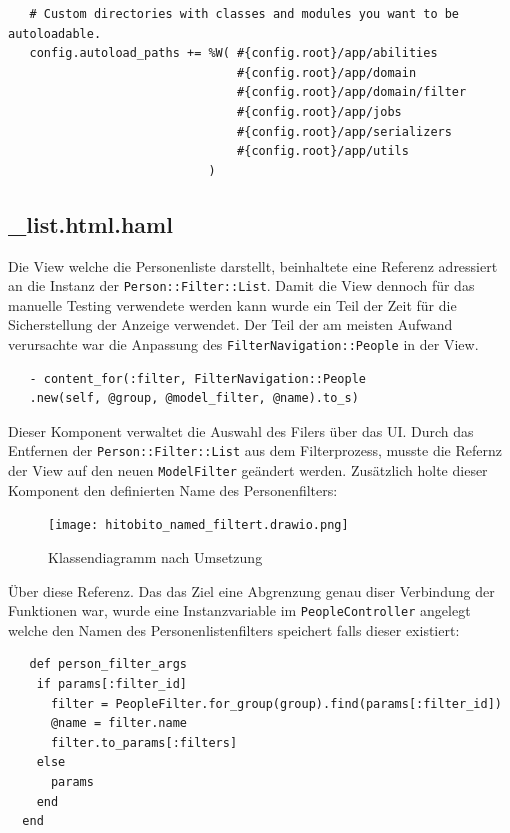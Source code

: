 \begin{verbatim}
   # Custom directories with classes and modules you want to be autoloadable.
   config.autoload_paths += %W( #{config.root}/app/abilities
                                #{config.root}/app/domain
                                #{config.root}/app/domain/filter
                                #{config.root}/app/jobs
                                #{config.root}/app/serializers
                                #{config.root}/app/utils
                            )
\end{verbatim}

\subsection{\_list.html.haml}
Die View welche die Personenliste darstellt, beinhaltete eine Referenz adressiert an die Instanz der \texttt{Person::Filter::List}. Damit die View dennoch für das manuelle Testing verwendete werden kann 
wurde ein Teil der Zeit für die Sicherstellung der Anzeige verwendet. Der Teil der am meisten Aufwand verursachte war die Anpassung des \texttt{FilterNavigation::People} in der View.

\begin{verbatim}
   - content_for(:filter, FilterNavigation::People
   .new(self, @group, @model_filter, @name).to_s)
\end{verbatim}

Dieser Komponent verwaltet die Auswahl des Filers über das UI. Durch das Entfernen der \texttt{Person::Filter::List} aus dem Filterprozess, musste die Refernz der View auf den neuen \texttt{ModelFilter}
geändert werden. Zusätzlich holte dieser Komponent den definierten Name des Personenfilters:

\newpage

\begin{figure}
   \centering
   \texttt{[image: hitobito\_named\_filtert.drawio.png]}
   \caption{Klassendiagramm nach Umsetzung}
\end{figure}

Über diese Referenz. Das das Ziel eine Abgrenzung genau diser Verbindung der Funktionen war, wurde eine Instanzvariable im \texttt{PeopleController} angelegt welche den Namen des Personenlistenfilters speichert
falls dieser existiert:

\begin{verbatim}
   def person_filter_args
    if params[:filter_id]
      filter = PeopleFilter.for_group(group).find(params[:filter_id])
      @name = filter.name
      filter.to_params[:filters]
    else
      params
    end
  end
\end{verbatim}


